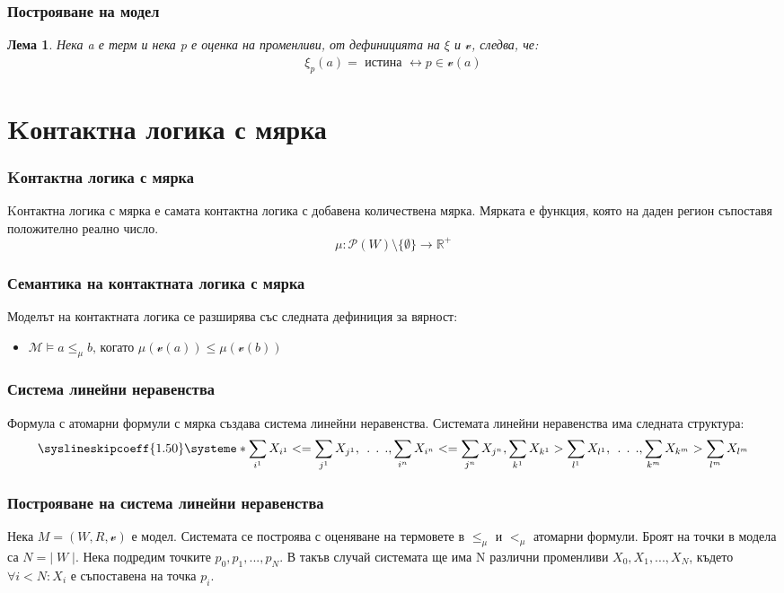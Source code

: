 \documentclass{beamer}
\newtheorem{lema}{Лема}[section]
\newcommand{\vE}{\mathscr{v}}
\newcommand{\vBool}{\xi}
\begin{document}
\begin{frame}\frametitle{Построяване на модел}
	\begin{lema}
		Нека a е терм и нека p е оценка на променливи, от дефиницията на $\vBool$ и $\vE$, следва, че:
		\begin{align*}
			\vBool_{p}(a) = \textit{ истина } \leftrightarrow p \in \vE(a)
		\end{align*}
	\end{lema}
\end{frame}

\section{Kонтактна логика с мярка}
\begin{frame}\frametitle{Kонтактна логика с мярка}
Kонтактна логика с мярка е самата контактна логика с добавена количествена мярка.
\newline
\newline
Мярката е функция, която на даден регион съпоставя положително реално число.
\begin{equation*}
	\mu : \mathscr{P}(W) \setminus \{\emptyset\} \longrightarrow \mathbb{R}^+
\end{equation*}
\end{frame}


\begin{frame}\frametitle{Семантика на контактната логика с мярка}
	Моделът на контактната логика се разширява със следната дефиниция за вярност:
	\begin{itemize}
		\item $\mathcal{M} \models a \leq_\mu b \text{, когато } \mu(\mathscr{v}(a)) \le \mu(\mathscr{v}(b))$
	\end{itemize}
\end{frame}

\begin{frame}\frametitle{Система линейни неравенства}
Формула с атомарни формули с мярка създава система линейни неравенства.
\newline
Системата линейни неравенства има следната структура:
		\[
			\syslineskipcoeff{1.50}
			\systeme*{\sum_{i^1} X_{i^1} <= \sum_{j^1} X_{j^1},
				\:\:.\:\:.\:\:.,
				\sum_{i^n} X_{i^n} <= \sum_{j^n} X_{j^n}, 
				\sum_{k^1} X_{k^1} > \sum_{l^1} X_{l^1},
				\:\:.\:\:.\:\:.,
				\sum_{k^m} X_{k^m} > \sum_{l^m} X_{l^m}
				}
		\]
\end{frame}

\begin{frame}\frametitle{Построяване на система линейни неравенства}
Нека $M = (W, R, \vE)$ е модел. Системата се построява с оценяване на термовете в $\le_\mu$ и  $<_\mu$ атомарни формули. 
\newline
Броят на точки в модела са $N = | \; W \; |$. Нека подредим точките $p_0, p_1, ..., p_N$. 
В такъв случай системата ще има N различни променливи $X_0, X_1, ..., X_N$, където $\forall i < N: X_i$ е съпоставена на точка $p_i$.
\end{frame}
\end{document}
